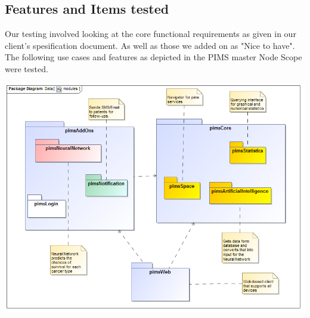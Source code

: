 \subsection{Features and Items tested}

Our testing involved looking at the core functional requirements as given in our client's spesification document. As well as those we added on as "Nice to have". The following use cases and features as depicted in the PIMS master Node Scope were tested.

\includegraphics[width=\linewidth]{./Graphics/modules.png}
\newpage			